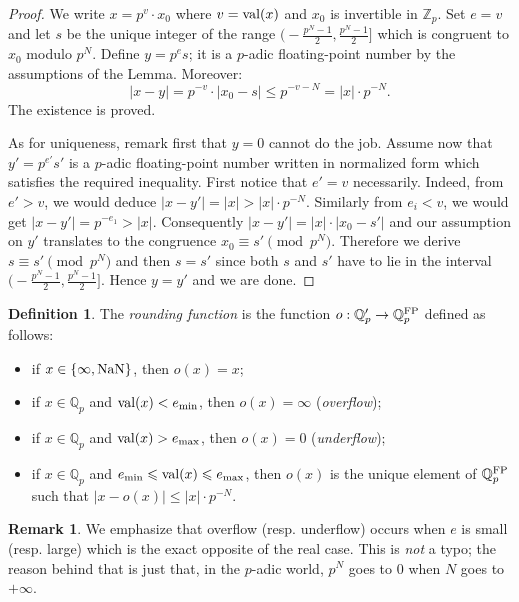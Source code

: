 \documentclass[11pt]{article}
\numberwithin{equation}{section}
\numberwithin{figure}{section}
\renewcommand{\leq}{\leqslant}
\theoremstyle{definition}
\newtheorem{deftn}[theo]{Definition}
\newtheorem{rem}[theo]{Remark}
\newcommand{\Z}{\mathbb Z}
\newcommand{\Zp}{\Z_p}
\newcommand{\Q}{\mathbb Q}
\newcommand{\Qp}{\Q_p}
\renewcommand{\min}{\text{\rm min}}
\renewcommand{\max}{\text{\rm max}}
\newcommand{\val}{\text{\rm val}}
\newcommand{\nan}{\text{\rm NaN}}
\newcommand{\FP}{\text{\rm FP}}
\newcommand{\QpFP}{\Qp^{\FP}}
\newcommand{\QpNan}{\Qp'}
\begin{document}
\begin{proof}
We write $x = p^v \cdot x_0$ where $v = \val(x)$ and $x_0$ is
invertible in $\Zp$. Set $e = v$ and let $s$ be the unique integer
of the range $\big(\!-\frac{p^N-1} 2,  \frac{p^N-1} 2\big]$ which is
congruent to $x_0$ modulo $p^N$. Define $y = p^e s$; it is a $p$-adic
floating-point number by the assumptions of the Lemma. Moreover:
$$|x - y| = p^{-v} \cdot |x_0 - s| \leq p^{-v-N} = |x| \cdot p^{-N}.$$
The existence is proved. 

As for uniqueness, remark first that $y = 0$ cannot do the job. Assume now 
that $y' = p^{e'} s'$ is a $p$-adic floating-point number written in 
normalized form which satisfies the required inequality. First notice 
that $e' = v$ necessarily. Indeed, from $e' > v$, we would deduce $|x - 
y'| = |x| > |x| \cdot p^{-N}$. Similarly from $e_i < v$, we 
would get $|x - y'| = p^{-e_1} > |x|$.
Consequently $|x-y'| = |x| \cdot |x_0 - s'|$ and our assumption on $y'$
translates to the congruence $x_0 \equiv s' \pmod {p^N}$. Therefore we
derive $s \equiv s' \pmod{p^N}$ and then $s = s'$ since both $s$ and $s'$
have to lie in the interval $\big(\!-\frac{p^N-1} 2,  \frac{p^N-1} 2\big]$.
Hence $y = y'$ and we are done.
\end{proof}

\begin{deftn}
The \emph{rounding function} is the function 
$o : \QpNan \to \QpFP$ defined as follows:
\begin{itemize}
\renewcommand{\itemsep}{0pt}
\item if $x \in \{\infty, \nan\}$, then $o(x) = x$;
\item if $x \in \Qp$ and $\val(x) < e_\min$,
then $o(x) = \infty$ (\emph{overflow});
\item if $x \in \Qp$ and $\val(x) > e_\max$,
then $o(x) = 0$ (\emph{underflow});
\item if $x \in \Qp$ and $e_\min \leq \val(x) \leq e_\max$,
then $o(x)$ is the unique element of $\QpFP$ such that
$|x - o(x)| \leq |x| \cdot p^{-N}$.
\end{itemize}
\end{deftn}

\begin{rem}
We emphasize that overflow (resp. underflow) occurs when $e$ is 
small (resp. large) which is the exact opposite of the real case.
This is \emph{not} a typo; the reason behind that is just that, in
the $p$-adic world, $p^N$ goes to $0$ when $N$ goes to $+\infty$.
\end{rem}
\end{document}
